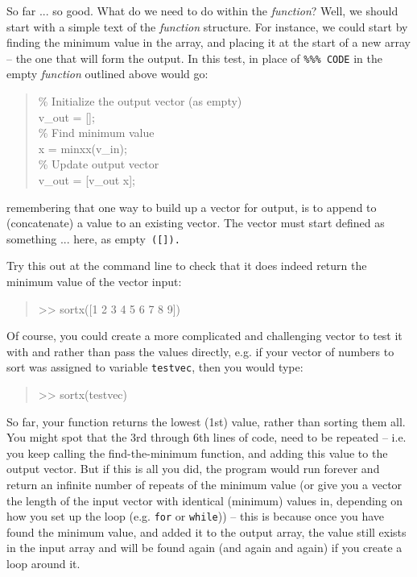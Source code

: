 \documentclass{tufte-book} %
\newenvironment{docspec}{\begin{quotation}\ttfamily\parskip0pt\parindent0pt\ignorespaces}{\end{quotation}}
\begin{document}
So far ... so good. What do we need to do within the \textit{function}? Well, we should start with a simple text of the \textit{function} structure. For instance, we could start by finding the minimum value in the array, and placing it at the start of a new array -- the one that will form the output. In this test, in place of \texttt{\textcolor[rgb]{0,0.501961,0}{\%\%\% CODE}} in the empty \textit{function} outlined above would go:
\begin{docspec}
\textcolor[rgb]{0,0.501961,0}{\% Initialize the output vector (as empty)}\\
v\_out = [];\\
\textcolor[rgb]{0,0.501961,0}{\% Find minimum value}\\
x = minxx(v\_in);\\
\textcolor[rgb]{0,0.501961,0}{\% Update output vector}\\
v\_out = [v\_out x];
\end{docspec}
remembering that one way to build up a vector for output, is to append to (concatenate) a value to an existing vector. The vector must start defined as something ... here, as empty\texttt{ ([]).}

Try this out at the command line to check that it does indeed return the minimum value of the vector input:
\begin{docspec}
>> sortx([1 2 3 4 5 6 7 8 9])
\end{docspec}
Of course, you could create a more complicated and challenging vector to test it with and rather than pass the values directly, e.g. if your vector of numbers to sort was assigned to variable \texttt{testvec}, then you would type:
\begin{docspec}
>> sortx(testvec)
\end{docspec}

So far, your function returns the lowest (1st) value, rather than sorting them all. You might spot that the 3rd through 6th lines of code, need to be repeated -- i.e. you keep calling the find-the-minimum function, and adding this value to the output vector. But if this is all you did, the program would run forever and return an infinite number of repeats of the minimum value (or give you a vector the length of the input vector with identical (minimum) values in, depending on how you set up the loop (e.g. \texttt{for} or \texttt{while})) -- this is because once you have found the minimum value, and added it to the output array, the value still exists in the input array and will be found again (and again and again) if you create a loop around it.
\end{document}
